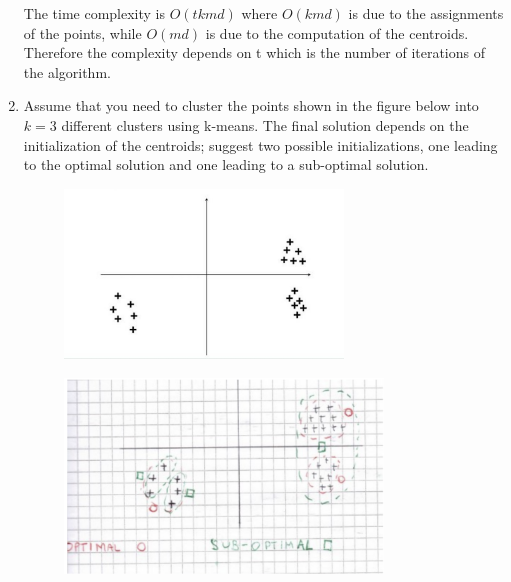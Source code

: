 \documentclass[a4paper,11pt,oneside]{book}
\begin{document}
\begin{enumerate}
\begin{solution}
        The time complexity is $O(tkmd)$ where $O(kmd)$ is due to the assignments of the points, while $O(md)$ is due to the computation of the centroids. Therefore the complexity depends on t which is the number of iterations of the algorithm.
    \end{solution}
\clearpage
\item Assume that you need to cluster the points shown in the figure below into $k = 3$ different clusters using k-means. The final solution depends on the initialization of the centroids; suggest two possible initializations, one leading to the optimal solution and one leading to a sub-optimal solution.
\begin{figure}[H]
    \centering
    \includegraphics[width=0.7\textwidth,height=0.7\textheight,keepaspectratio]{images/4_Jul_2021.png}
 \end{figure}
    \begin{solution}
        \begin{figure}[H]
            \centering
            \includegraphics[width=0.8\textwidth,height=0.8\textheight,keepaspectratio]{images/2_4_6_Jul_2021.png}
         \end{figure}
    \end{solution}
\end{enumerate}

\end{document}

